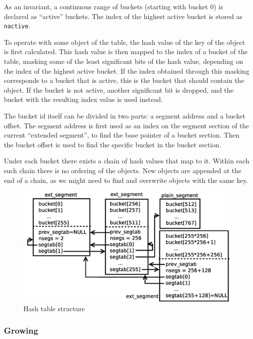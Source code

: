 \documentclass[aps,pre,preprint,nofootinbib]{revtex4}
\begin{document}
As an invariant, a continuous range of buckets (starting with bucket 0) is declared as ``active'' buckets.
The index of the highest active bucket is stored as \verb|nactive|.

To operate with some object of the table, the hash value of the key of the object is first calculated.
This hash value is then mapped to the index of a bucket of the table, masking some of the least significant bits of the hash value, depending on the index of the highest active bucket.
If the index obtained through this masking corresponds to a bucket that is active, this is the bucket that should contain the object.
If the bucket is not active, another significant bit is dropped, and the bucket with the resulting index value is used instead.

The bucket id itself can be divided in two parts: a segment address and a bucket offset.
The segment address is first used as an index on the segment section of the current ``extended segment'', to find the base pointer of a bucket section.
Then the bucket offset is used to find the specific bucket in the bucket section.

Under each bucket there exists a chain of hash values that map to it.
Within each such chain there is no ordering of the objects.
New objects are appended at the end of a chain, as we might need to find and overwrite objects with the same key.

\begin{figure}[htb]
\centering
\includegraphics[width=1.0\textwidth]{hash_table_structure.eps}
\caption{Hash table structure} 
\label{fig:hash_table_structure}
\end{figure}

\subsubsection{Growing}
\end{document}
